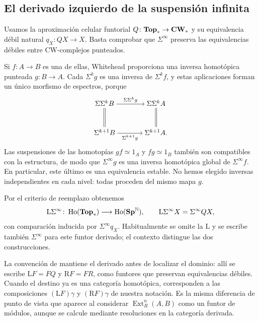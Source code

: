 \subsection{El derivado izquierdo de la suspensión infinita}

Usamos la aproximación celular funtorial $Q\colon\mathbf{Top}_*\to\mathbf{CW}_*$ y su equivalencia débil natural $q_X\colon QX\to X$. Basta comprobar que $\Sigma^\infty$ preserva las equivalencias débiles entre CW-complejos punteados.

Si $f\colon A\to B$ es una de ellas, Whitehead proporciona una inversa homotópica punteada $g\colon B\to A$. Cada $\Sigma^kg$ es una inversa de $\Sigma^kf$, y estas aplicaciones forman un único morfismo de espectros, porque
\[
\begin{tikzcd}[cramped,column sep=large,row sep=large]
\Sigma\Sigma^kB \arrow[r,"\Sigma\Sigma^kg"] \arrow[d,equal]
& \Sigma\Sigma^kA \arrow[d,equal]\\
\Sigma^{k+1}B \arrow[r,"\Sigma^{k+1}g"'] & \Sigma^{k+1}A.
\end{tikzcd}
\]
Las suspensiones de las homotopías $gf\simeq1_A$ y $fg\simeq1_B$ también son compatibles con la estructura, de modo que $\Sigma^\infty g$ es una inversa homotópica global de $\Sigma^\infty f$. En particular, este último es una equivalencia estable. No hemos elegido inversas independientes en cada nivel: todas proceden del mismo mapa $g$.

Por el criterio de reemplazo obtenemos
\[
\mathrm L\Sigma^\infty\colon\operatorname{Ho}(\mathbf{Top}_*)\longrightarrow\operatorname{Ho}(\mathbf{Sp}^{\mathbb N}),\qquad
\mathrm L\Sigma^\infty X=\Sigma^\infty QX,
\]
con comparación inducida por $\Sigma^\infty q_X$. Habitualmente se omite la $\mathrm L$ y se escribe también $\Sigma^\infty$ para este funtor derivado; el contexto distingue las dos construcciones.

\begin{nota}
La convención de \cite[Definición~3.4.2.3]{malkiewich} mantiene el derivado antes de localizar el dominio: allí se escribe $\mathrm LF=FQ$ y $\mathrm RF=FR$, como funtores que preservan equivalencias débiles. Cuando el destino ya es una categoría homotópica, corresponden a las composiciones $(\mathrm LF)\gamma$ y $(\mathrm RF)\gamma$ de nuestra notación. Es la misma diferencia de punto de vista que aparece al considerar $\operatorname{Ext}^n_R(A,B)$ como un funtor de módulos, aunque se calcule mediante resoluciones en la categoría derivada.
\end{nota}

